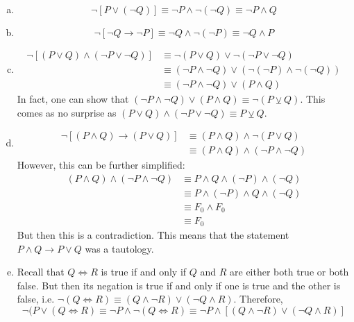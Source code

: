 \documentclass[11pt,letterpaper]{article}
\begin{document}
\begin{enumerate}[(a)]
\item 
	\[
	\neg [P \vee (\neg Q)] \equiv \neg P \wedge \neg (\neg Q) \equiv \neg P \wedge Q
	\]

\item 
	\[
	\neg [\neg Q \to \neg P] \equiv  \neg Q \wedge \neg (\neg P) \equiv \neg Q \wedge P
	\]

\item 
	\[
	\begin{aligned}
	\neg [ (P \vee Q) \wedge (\neg P \vee \neg Q) ] &\equiv \neg (P \vee Q) \vee \neg (\neg P \vee \neg Q) \\
	&\equiv (\neg P \wedge \neg Q) \vee (\neg (\neg P) \wedge \neg (\neg Q)) \\
	&\equiv (\neg P \wedge \neg Q) \vee (P \wedge Q)
	\end{aligned}
	\]
In fact, one can show that $(\neg P \wedge \neg Q) \vee (P \wedge Q) \equiv \neg (P \veebar Q)$. This comes as no surprise as $(P \vee Q) \wedge (\neg P \vee \neg Q) \equiv P \veebar Q$. 

\item 
	\[
	\begin{aligned}
	\neg [(P \wedge Q) \to (P \vee Q)] &\equiv (P \wedge Q) \wedge \neg (P \vee Q) \\
	&\equiv (P \wedge Q) \wedge (\neg P \wedge \neg Q)
	\end{aligned}
	\]
However, this can be further simplified: 
	\[
	\begin{aligned}
	(P \wedge Q) \wedge (\neg P \wedge \neg Q)&\equiv P \wedge Q \wedge (\neg P) \wedge (\neg Q) \\
	&\equiv P \wedge (\neg P) \wedge Q \wedge (\neg Q) \\
	&\equiv F_0 \wedge F_0 \\
	&\equiv F_0
	\end{aligned}
	\]
But then this is a contradiction. This means that the statement $P \wedge Q \to P \vee Q$ was a tautology. 

\item Recall that $Q \Leftrightarrow R$ is true if and only if $Q$ and $R$ are either both true or both false. But then its negation is true if and only if one is true and the other is false, i.e. $\neg (Q \Leftrightarrow R) \equiv (Q \wedge \neg R) \vee (\neg Q \wedge R)$. Therefore,
	\[
	\neg (P \vee (Q \Leftrightarrow R) \equiv \neg P \wedge \neg (Q \Leftrightarrow R) \equiv \neg P \wedge [ (Q \wedge \neg R) \vee (\neg Q \wedge R) ]
	\]
\end{enumerate}
\end{document}
